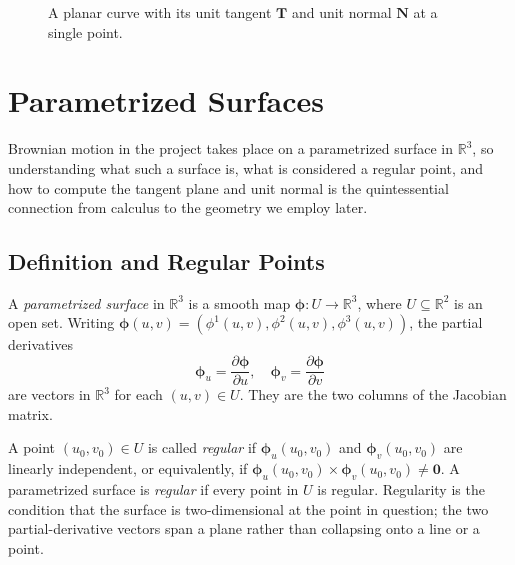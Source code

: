 \documentclass{article}
\begin{document}
\begin{figure}[H]
\centering
{}
\caption{A planar curve with its unit tangent $\mathbf{T}$ and unit normal $\mathbf{N}$ at a single point.}
\label{fig:frenet}
\end{figure}

\section{Parametrized Surfaces}

Brownian motion in the project takes place on a parametrized surface in $\mathbb{R}^3$, so understanding what such a surface is, what is considered a regular point, and how to compute the tangent plane and unit normal is the quintessential connection from calculus to the geometry we employ later.

\subsection{Definition and Regular Points}

A \textit{parametrized surface} in $\mathbb{R}^3$ is a smooth map $\boldsymbol{\phi}: U \to \mathbb{R}^3$, where $U \subseteq \mathbb{R}^2$ is an open set. Writing $\boldsymbol{\phi}(u, v) = (\phi^1(u, v), \phi^2(u, v), \phi^3(u, v))$, the partial derivatives
$$\boldsymbol{\phi}_u = \frac{\partial \boldsymbol{\phi}}{\partial u}, \quad \boldsymbol{\phi}_v = \frac{\partial \boldsymbol{\phi}}{\partial v}$$
are vectors in $\mathbb{R}^3$ for each $(u, v) \in U$. They are the two columns of the Jacobian matrix.

A point $(u_0, v_0) \in U$ is called \textit{regular} if $\boldsymbol{\phi}_u(u_0, v_0)$ and $\boldsymbol{\phi}_v(u_0, v_0)$ are linearly independent, or equivalently, if $\boldsymbol{\phi}_u(u_0, v_0) \times \boldsymbol{\phi}_v(u_0, v_0) \neq \mathbf{0}.$
A parametrized surface is \textit{regular} if every point in $U$ is regular. Regularity is the condition that the surface is two-dimensional at the point in question; the two partial-derivative vectors span a plane rather than collapsing onto a line or a point. 
\end{document}
